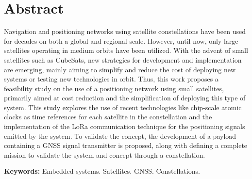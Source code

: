%
%
%
%
%

%
%
%
%
%

\chapter*{Abstract}

{\parindent0pt
Navigation and positioning networks using satellite constellations have been used for decades on both a global and regional scale. However, until now, only large satellites operating in medium orbits have been utilized. With the advent of small satellites such as CubeSats, new strategies for development and implementation are emerging, mainly aiming to simplify and reduce the cost of deploying new systems or testing new technologies in orbit. Thus, this work proposes a feasibility study on the use of a positioning network using small satellites, primarily aimed at cost reduction and the simplification of deploying this type of system. This study explores the use of recent technologies like chip-scale atomic clocks as time references for each satellite in the constellation and the implementation of the LoRa communication technique for the positioning signals emitted by the system. To validate the concept, the development of a payload containing a GNSS signal transmitter is proposed, along with defining a complete mission to validate the system and concept through a constellation.
}

\smallskip
\noindent \textbf{Keywords:} Embedded systems. Satellites. GNSS. Constellations.
